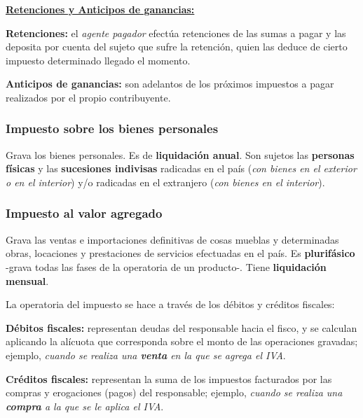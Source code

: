 \documentclass[10pt,a4paper]{article}
\begin{document}
\underline{\textbf{Retenciones y Anticipos de ganancias:}}

\begin{description}
\item \textbf{Retenciones:} el \textit{agente pagador} efectúa retenciones de las sumas a pagar y las deposita por cuenta del sujeto que sufre la retención, quien las deduce de cierto impuesto determinado llegado el momento.
\item \textbf{Anticipos de ganancias:} son adelantos de los próximos impuestos a pagar realizados por el propio contribuyente.
\end{description}

\subsubsection{Impuesto sobre los bienes personales}

Grava los bienes personales. Es de \textbf{liquidación anual}. Son sujetos las \textbf{personas físicas} y las \textbf{sucesiones indivisas} radicadas en el país (\textit{con bienes en el exterior o en el interior}) y/o radicadas en el extranjero (\textit{con bienes en el interior}).

\subsubsection{Impuesto al valor agregado}

Grava las ventas e importaciones definitivas de cosas mueblas y determinadas obras, locaciones y prestaciones de servicios efectuadas en el país. Es \textbf{plurifásico} -grava todas las fases de la operatoria de un producto-. Tiene \textbf{liquidación mensual}.

La operatoria del impuesto se hace a través de los débitos y créditos fiscales:
\begin{description}
\item \textbf{Débitos fiscales:} representan deudas del responsable hacia el fisco, y se calculan aplicando la alícuota que corresponda sobre el monto de las operaciones gravadas; ejemplo, \textit{cuando se realiza una \textbf{venta} en la que se agrega el IVA}.
\item \textbf{Créditos fiscales:} representan la suma de los impuestos facturados por las compras y erogaciones (pagos) del responsable; ejemplo, \textit{cuando se realiza una \textbf{compra} a la que se le aplica el IVA}.
\end{description}
\end{document}
